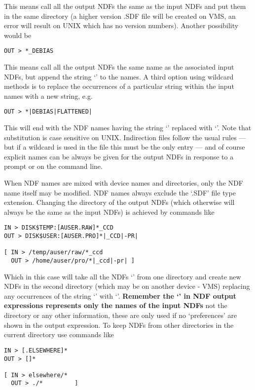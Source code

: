 This means call all the output NDFs the same as the input NDFs and put
them in the same directory (a higher version .SDF file will be created
on VMS, an error will result on UNIX which has no version numbers).
Another possibility would be
\begin{myquote}
\begin{verbatim}
OUT > *_DEBIAS
\end{verbatim}
\end{myquote}

This means call all the output NDFs the same name as the associated
input NDFs, but append the string `' to the names. A
third option using wildcard methods is to replace the occurrences of a
particular string within the input names with a new string, e.g.
\begin{myquote}
\begin{verbatim}
OUT > *|DEBIAS|FLATTENED|
\end{verbatim}
\end{myquote}

This will end with the NDF names having the string `' 
replaced with `'. Note that substitution is case
sensitive on UNIX. Indirection files follow the usual rules --- but
if a wildcard is used in the file this must be the only
entry --- and of course explicit names can be always be given for the
output NDFs in response to a prompt or on the command line.

When NDF names are mixed with device names and directories, only the NDF
name itself may be modified. NDF names always exclude the `.SDF' file
type extension. Changing the directory of the output NDFs (which
otherwise will always be the same as the input NDFs) is achieved by
commands like
\begin{myquote}
\begin{verbatim}
IN > DISK$TEMP:[AUSER.RAW]*_CCD
OUT > DISK$USER:[AUSER.PRO]*|_CCD|-PR|

[ IN > /temp/auser/raw/*_ccd
  OUT > /home/auser/pro/*|_ccd|-pr| ]
\end{verbatim}
\end{myquote}

Which in this case will take all the NDFs `' from one
directory and create new NDFs in the second directory (which may be on
another device - VMS) replacing any occurrences of the string
`' with `'. {\bf Remember the
`\myverb{*}' in NDF output expressions represents only the names of
the input NDFs} not the directory or any other information, these are
only used if no `preferences' are shown in the output expression. To
keep NDFs from other directories in the current directory use commands
like
\begin{myquote}
\begin{verbatim}
IN > [.ELSEWHERE]*
OUT > []*

[ IN > elsewhere/*
  OUT > ./*         ]
\end{verbatim}
\end{myquote}

